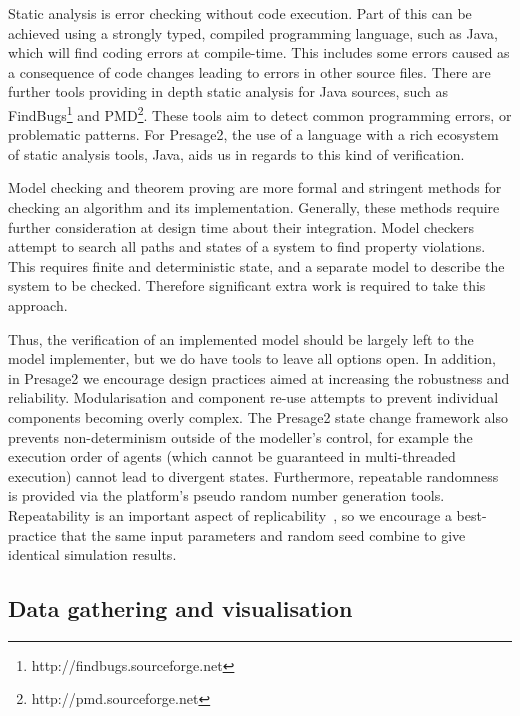 Static analysis is error checking without code execution. Part of this can be
achieved using a strongly typed, compiled programming language, such as Java,
which will find coding errors at compile-time. This includes some errors
caused as a consequence of code changes leading to errors in other source
files. There are further tools providing in depth static analysis for Java
sources, such as FindBugs\footnote{http://findbugs.sourceforge.net} and
PMD\footnote{http://pmd.sourceforge.net}. These tools aim to detect common
programming errors, or problematic patterns. For Presage2, the use of a
language with a rich ecosystem of static analysis tools, Java, aids us in
regards to this kind of verification.

Model checking and theorem proving are more formal and stringent methods for
checking an algorithm and its implementation. Generally, these methods require
further consideration at design time about their integration. Model
checkers attempt to search all paths and states of a system to find property
violations. This requires finite and deterministic state, and a separate model
to describe the system to be checked. Therefore significant extra work is
required to take this approach.

Thus, the verification of an implemented model should be largely left to the
model implementer, but we do have tools to leave all options open. In
addition, in Presage2 we encourage design practices aimed at increasing the
robustness and reliability. Modularisation and component re-use attempts to
prevent individual components becoming overly complex. The Presage2 state
change framework also prevents non-determinism outside of the modeller's
control, for example the execution order of agents (which cannot be guaranteed
in multi-threaded execution) cannot lead to divergent states. Furthermore,
repeatable randomness is provided via the platform's pseudo random
number generation tools. Repeatability is an important aspect of
replicability~\citep{Axelrod1997,Ormerod2009}, so we encourage a best-practice
that the same input parameters and random seed combine to give identical
simulation results.


\subsection{Data gathering and visualisation}

